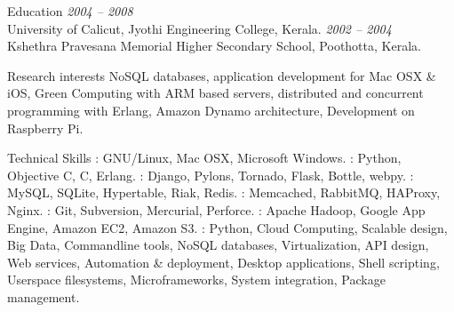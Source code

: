 \documentclass{resume}
\author{Sreejith Kesavan}
\begin{document}
\maketitle


\begin{category}{Education}
   \hfill {\em 2004 -- 2008}\\
  University of Calicut, Jyothi Engineering College, Kerala.
   \hfill {\em 2002 -- 2004}\\
  Kshethra Pravesana Memorial Higher Secondary School, Poothotta, Kerala.
\end{category}


\begin{category}{Research interests}
  \citemnobullet NoSQL databases, application development for Mac OSX \& iOS, Green Computing with 
  ARM based servers, distributed and concurrent programming with Erlang, Amazon Dynamo architecture, 
  Development on Raspberry Pi.
\end{category}

\begin{category}{Technical Skills}
  : GNU/Linux, Mac OSX, Microsoft Windows.
  : Python, Objective C, C, Erlang.
  : Django, Pylons, Tornado, Flask, Bottle, webpy.
  : MySQL, SQLite, Hypertable, Riak, Redis.
  : Memcached, RabbitMQ, HAProxy, Nginx.
  : Git, Subversion, Mercurial, Perforce.
  : Apache Hadoop, Google App Engine, Amazon EC2, Amazon S3.
  : Python, Cloud Computing, Scalable design, Big Data, Commandline 
  tools, NoSQL databases, Virtualization, API design, Web services, Automation \& deployment, 
  Desktop applications, Shell scripting, Userspace filesystems, Microframeworks, System integration, 
  Package management.
\end{category}

\end{document}
